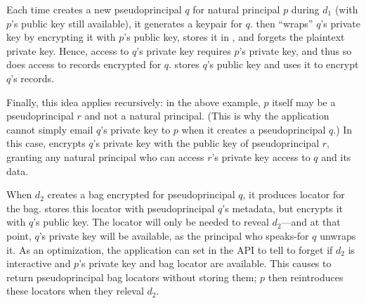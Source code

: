 %
%
%
Each time \sys creates a new pseudoprincipal $q$ for natural principal $p$
during $d_1$ (with $p$'s public key still available), it generates a keypair
for $q$.
%
\sys then ``wraps'' $q$'s private key by encrypting it with $p$'s public key,
stores it in , and forgets the plaintext private key.
%
Hence, access to $q$'s private key requires $p$'s private key, and thus
so does access to records encrypted for $q$.
%
\sys stores $q$'s public key and uses it to encrypt $q$'s records.
%

%
Finally, this idea applies recursively: in the above example, $p$ itself may
be a pseudoprincipal $r$ and not a natural principal.
%
(This is why the application cannot \eg simply email $q$'s private key to
$p$ when it creates a pseudoprincipal $q$.)
%
In this case, \sys encrypts $q$'s private key with the public key of
pseudoprincipal $r$, granting any natural principal who can access
$r$'s private key access to $q$ and its data.
%


%
When $d_2$ creates a bag encrypted for pseudoprincipal $q$, it produces
locator  for the bag.
%
\sys stores this locator with pseudoprincipal $q$'s metadata, but encrypts
it with $q$'s public key.
%
The locator will only be needed to reveal $d_2$---and at that point,
$q$'s private key will be available, as the principal who speaks-for $q$
unwraps it.
%
As an optimization, the application can set 
in the API to tell \sys to forget  if $d_2$ is interactive
and $p$'s private key and bag locator  are available.
%
This causes \sys to return pseudoprincipal bag locators without
storing them; $p$ then reintroduces these locators when they releval
$d_2$.
%


